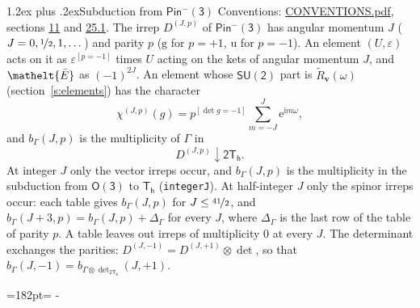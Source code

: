 \documentclass[10pt,a4paper]{article}
\makeatletter
\renewcommand\section{\@startsection{section}{1}{\z@}{-3ex plus -1ex minus -.2ex}%
  {1.2ex plus .2ex}{\normalfont\large\sffamily\bfseries\color{parttitle}}}
\newcommand{\needspace}[1]{\par\penalty-100\begingroup\dimen0=#1\relax\dimen2=\pagegoal
  \advance\dimen2-\pagetotal\ifdim\dimen0>\dimen2\relax\ifdim\dimen2>0pt\vfil\break\fi\fi
  \endgroup}
\numberwithin{equation}{section}
\newcommand{\eltfont}[1]{{\let\sigma\eltsigma\mathelt{#1}}}
\newcommand{\grp}[1]{\mathsf{#1}}
\newcommand{\elt}[1]{\eltfont{#1}}
\newcommand{\ptag}[1]{\mathrm{#1}}
\newcommand{\iverson}[1]{[#1]}
\newcommand{\restr}[2]{#1\!\downarrow#2}
\newcommand{\vv}{\mathbf{v}}
\newcommand{\iunit}{\mathrm{i}}
\newcommand{\expe}{\mathrm{e}}
\newcommand{\irrJp}[2]{D^{(#1,#2)}}
\newcommand{\irrprod}{\otimes}
\newcommand{\barred}[1]{\bar{#1}}
\newcommand{\lift}[1]{\tilde{#1}}
\makeatother
\begin{document}
\section{Subduction from \texorpdfstring{$\grp{Pin^{-}(3)}$}{Pin(3)}}\label{s:subduction_parent}
Conventions: \href{../../CONVENTIONS.pdf}{CONVENTIONS.pdf}, sections \href{../../../rotation/CONVENTIONS.pdf\#conv.11}{11} and \href{../../CONVENTIONS.pdf\#conv.25.1}{25.1}.
\leavevmode\label{n:index.J}\label{n:index.parity}\label{n:irrep.o3}The irrep $\irrJp{J}{p}$ of \href{Pinminus3.pdf}{$\grp{Pin^{-}(3)}$} has angular momentum $J$ ($J = 0, \nicefrac{1}{2}, 1, \dots$) and parity $p$ ($\ptag{g}$ for $p = +1$, $\ptag{u}$ for $p = -1$). An element $(U, \varepsilon)$ acts on it as $\varepsilon^{[p = -1]}$ times $U$ acting on the kets of angular momentum $J$, and $\elt{\barred{E}}$ as $(-1)^{2J}$. \label{n:function.character.parent}\label{n:function.multiplicity}An element whose $\grp{SU(2)}$ part is $\lift{R}_{\vv}(\omega)$ (section~\ref{s:elements}) has the character
\begin{equation}\label{e:chi}\chi^{(J,p)}(g) = p^{\iverson{\det g = -1}}\sum_{m=-J}^{J} \expe^{\iunit m\omega},\end{equation}
and $b_\Gamma(J, p)$ is the multiplicity of $\Gamma$ in
\begin{equation}\label{e:parent}\restr{\irrJp{J}{p}}{\grp{2T_{h}}}.\end{equation}
At integer $J$ only the vector irreps occur, and $b_\Gamma(J, p)$ is the multiplicity in the subduction from $\grp{O(3)}$ to \href{../../../rotation/data/pdf/Th.pdf}{$\grp{T_{h}}$} (\texttt{integerJ}). \label{n:index.increment}At half-integer $J$ only the spinor irreps occur: each table gives $b_\Gamma(J, p)$ for $J \le \nicefrac{41}{2}$, and $b_\Gamma(J + 3, p) = b_\Gamma(J, p) + \Delta_\Gamma$ for every $J$, where $\Delta_\Gamma$ is the last row of the table of parity $p$. A table leaves out irreps of multiplicity 0 at every $J$.
\leavevmode\label{n:operator.determinant.character}The determinant exchanges the parities: $\irrJp{J}{-1} = \irrJp{J}{+1} \irrprod \det$, so that $b_\Gamma(J, -1) = b_{\Gamma \irrprod \det_{\grp{2T_{h}}}}(J, +1)$.
\needspace{182pt}
\end{document}
